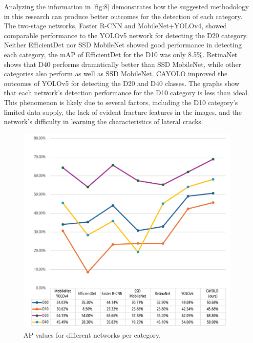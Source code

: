\documentclass[sensors,article,submit,moreauthors]{Definitions/mdpi}
\begin{document}
    Analyzing the information in \autoref{fig:8} demonstrates how the suggested methodology in this research can produce better outcomes for the detection of each category. The two-stage networks, Faster R-CNN and MobileNet+YOLOv4, showed comparable performance to the YOLOv5 network for detecting the D20 category. Neither EfficientDet nor SSD MobileNet showed good performance in detecting each category, the mAP of EfficientDet for the D10 was only 8.5\%. RetinaNet shows that D40 performs dramatically better than SSD MobileNet, while other categories also perform as well as SSD MobileNet. CAYOLO improved the outcomes of YOLOv5 for detecting the D20 and D40 classes. The graphs show that each network's detection performance for the D10 category is less than ideal. This phenomenon is likely due to several factors, including the D10 category's limited data supply, the lack of evident fracture features in the images, and the network's difficulty in learning the characteristics of lateral cracks.

    \begin{figure}[H]
        \includegraphics[width=\textwidth]{./images/figure8}
        \caption{AP values for different networks per category.\label{fig:8}}
    \end{figure}
\end{document}
